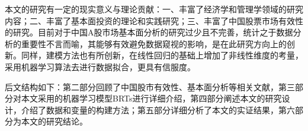 本文的研究有一定的现实意义与理论贡献：一、丰富了经济学和管理学领域的研究内容；二、丰富了基本面投资的理论和实践研究；三、丰富了中国股票市场有效性的研究。目前对于中国A股市场基本面分析的研究过少且不完善，统计之于数据分析的重要性不言而喻，其能够有效避免数据窥视的影响，是在此研究方向上的创新。同样，建模方法也有所创新，在线性回归的基础上增加了非线性维度的考量，采用机器学习算法去进行数据拟合，更具有信服度。

后文结构如下：第二部分回顾了中国股市有效性、基本面分析等相关文献，第三部分对本文采用的机器学习模型BRTs进行详细介绍，第四部分阐述本文的研究设计，介绍了数据和变量的构建方法；第五部分详细分析了本文的实证结果，第六部分为本文的研究结论。
